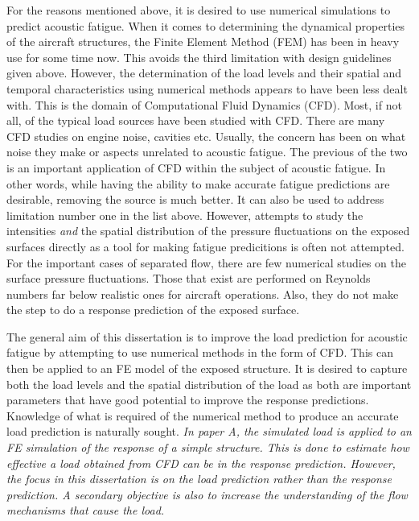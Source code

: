 For the reasons mentioned above, it is desired to use numerical simulations to predict acoustic fatigue. When it comes to determining the dynamical properties of the aircraft structures, the Finite Element Method (FEM) has been in heavy use for some time now. This avoids the third limitation with design guidelines given above. However, the determination of the load levels and their spatial and temporal characteristics using numerical methods appears to have been less dealt with. This is the domain of Computational Fluid Dynamics (CFD). Most, if not all, of the typical load sources have been studied with CFD. There are many CFD studies on engine noise, cavities etc. Usually, the concern has been on what noise they make or aspects unrelated to acoustic fatigue. The previous of the two is an important application of CFD within the subject of acoustic fatigue. In other words, while having the ability to make accurate fatigue predictions are desirable, removing the source is much better. It can also be used to address limitation number one in the list above. However, attempts to study the intensities \emph{and} the spatial distribution of the  pressure fluctuations on the exposed surfaces directly as a tool for making fatigue predicitions is often not attempted. For the important cases of separated flow, there are few numerical studies on the surface pressure fluctuations. Those that exist are performed on Reynolds numbers far below realistic ones for aircraft operations. Also, they do not make the step to do a response prediction of the exposed surface.

The general aim of this dissertation is to improve the load prediction for acoustic fatigue by attempting to use numerical methods in the form of CFD. %
This can then be applied to an FE model of the exposed structure. %
It is desired to capture both the load levels and the spatial distribution of the load as both are important parameters that have good potential to improve the response predictions. Knowledge of what is required of the numerical method to produce an accurate load prediction is naturally sought. {\em In paper A, the simulated load is applied to an FE simulation of the response of a simple structure. This is done to estimate how effective a load obtained from CFD can be in the response prediction. However, the focus in this dissertation is on the load prediction rather than the response prediction. A secondary objective is also to increase the understanding of the flow mechanisms that cause the load.} 


